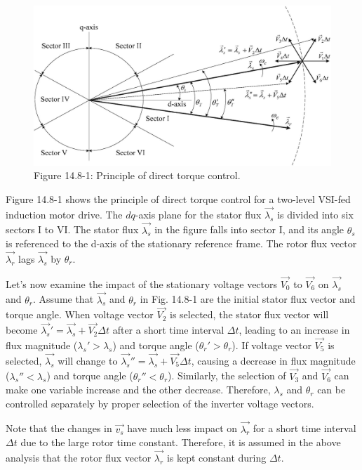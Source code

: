 \documentclass[letterpaper,12pt]{article}
\begin{document}
\begin{figure}[h]
\centering
\includegraphics{graficos/img23.jpg}
\caption{Figure 14.8-1: Principle of direct torque control.}
\label{fig:14.8-1}
\end{figure}
\FloatBarrier

Figure 14.8-1 shows the principle of direct torque control for a two-level VSI-fed induction motor drive. The $dq$-axis plane for the stator flux $\vec{\lambda_s}$ is divided into six sectors I to VI. The stator flux $\vec{\lambda_s}$ in the figure falls into sector I, and its angle $\theta_s$ is referenced to the d-axis of the stationary reference frame. The rotor flux vector $\vec{\lambda_r}$ lags $\vec{\lambda_s}$ by $\theta_r$.

Let’s now examine the impact of the stationary voltage vectors $\vec{V_0}$ to $\vec{V_6}$ on $\vec{\lambda_s}$ and $\theta_r$. Assume that $\vec{\lambda_s}$ and $\theta_r$ in Fig. 14.8-1 are the initial stator flux vector and torque angle. When voltage vector $\vec{V_2}$ is selected, the stator flux vector will become $\vec{\lambda_s}' = \vec{\lambda_s} + \vec{V_2}\Delta t$ after a short time interval $\Delta t$, leading to an increase in flux magnitude ($\lambda_s' > \lambda_s$) and torque angle ($\theta_r' > \theta_r$). If voltage vector $\vec{V_5}$ is selected, $\vec{\lambda_s}$ will change to $\vec{\lambda_s}'' = \vec{\lambda_s} + \vec{V_5}\Delta t$, causing a decrease in flux magnitude ($\lambda_s'' < \lambda_s$) and torque angle ($\theta_r'' < \theta_r$). Similarly, the selection of $\vec{V_3}$ and $\vec{V_6}$ can make one variable increase and the other decrease. Therefore, $\lambda_s$ and $\theta_r$ can be controlled separately by proper selection of the inverter voltage vectors.

Note that the changes in $\vec{v_s}$ have much less impact on $\vec{\lambda_r}$ for a short time interval $\Delta t$ due to the large rotor time constant. Therefore, it is assumed in the above analysis that the rotor flux vector $\vec{\lambda_r}$ is kept constant during $\Delta t$.
\end{document}
